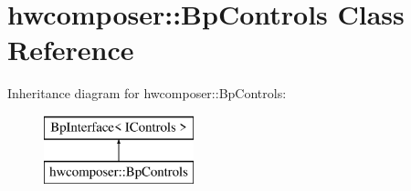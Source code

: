 \hypertarget{classhwcomposer_1_1BpControls}{}\section{hwcomposer\+:\+:Bp\+Controls Class Reference}
\label{classhwcomposer_1_1BpControls}
Inheritance diagram for hwcomposer\+:\+:Bp\+Controls\+:\begin{figure}[H]
\begin{center}
\leavevmode
\includegraphics[height=2.000000cm]{classhwcomposer_1_1BpControls}
\end{center}
\end{figure}
